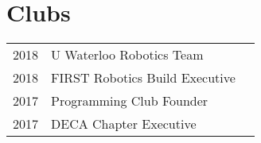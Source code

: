 \documentclass[]{chandan-cv}
\begin{document}
\begin{minipage}[t]{0.33\textwidth}

\section{Clubs} 
\begin{tabular}{rll}
2018		&	U Waterloo Robotics Team\\
2018		&	FIRST Robotics Build Executive\\
2017		&	Programming Club Founder\\
2017		&	DECA Chapter Executive\\
\end{tabular}
\sectionsep

%
%

\end{minipage} 
\hfill
\end{document}
